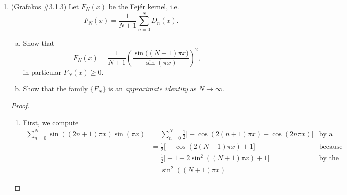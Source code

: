 \documentclass[a4paper]{article}
\begin{document}
\begin{enumerate}
\begin{proof}
\begin{enumerate}
      Combining these two, we have
      \begin{align*}
        \| D_N \|_{L^1} &= 2 \int_{0}^{\frac{1}{2N+1}} \left| \frac{\sin\left( (2N+1) \pi x \right)}{\sin( \pi x )} \right| dx + 2 \sum_{k=1}^{N}
        \int_{\frac{k}{2N+1}}^{\frac{k+1}{2N+1}} \left| \frac{\sin\left( (2N+1)\pi x \right)}{\sin(\pi x)} \right| dx \\
        &\leq 2 + \sum_{k=1}^N \frac{2}{\pi k} \\
        &\leq 2 + \frac{2}{\pi} \log N
      \end{align*}

      Thus there exist constants $c,C$ such that
      \[ c \log N \leq \|D_N\|_{L^1} \leq C \log N .\]

  \end{enumerate}

\end{proof}

\item (Grafakos \#3.1.3) Let $F_N (x)$ be the Fej\'{e}r  kernel, i.e. $$ F_N (x) = \frac1{N+1} \sum_{n=0}^N D_n (x). $$

\begin{enumerate}[(a)]
\item Show that $$ F_N (x)  = \frac{1}{N+1} \left( \frac{\sin \big( (N+1) \pi x\big)}{ \sin (\pi x)} \right)^2 , $$ in particular $F_N (x) \ge 0$.
\item Show that the family $\{ F_N \}$ is an {\it{approximate identity}} as $N\rightarrow \infty$.

\end{enumerate}

\begin{proof}
  \begin{enumerate}
    \item
      First, we compute
      \begin{align}
        \sum_{n=0}^N \sin \left( (2n+1) \pi x \right) \sin ( \pi x ) &= \sum_{n=0}^N \frac{1}{2} \big[ - \cos \left( 2 (n+1) \pi x \right) + \cos
        \left( 2 n \pi x \right) \big] &\text{by a product identity} \nonumber \\
        &= \frac{1}{2} \big[ - \cos \left( 2(N+1) \pi x \right) + 1 \big] &\text{because our sum telescopes} \nonumber \\
        &= \frac{1}{2} \big[ - 1 + 2 \sin^2 \left( (N+1) \pi x \right) + 1 \big] &\text{by the double-angle formula} \nonumber \\
        &= \sin^2 \left( (N+1) \pi x \right)
        \label{eqn:trig_prod}
      \end{align}


\end{enumerate}
\end{proof}
\end{enumerate}
\end{document}
